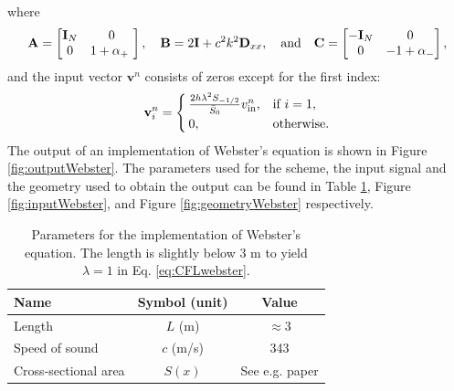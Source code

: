 where 
\begin{equation*}
    \begin{gathered}
    \mathbf{A} = \begin{bmatrix}
        \mathbf{I}_{N}& 0\\
        0 & 1 + \alpha_+\
    \end{bmatrix}, \quad \mathbf{B} = 2\mathbf{I} + c^2 k^2 \mathbf{D}_{xx}, \quad \text{and} \quad \mathbf{C} = \begin{bmatrix}
        -\mathbf{I}_N & 0\\
        0 & -1 + \alpha_-
    \end{bmatrix},
    \end{gathered}
\end{equation*}
and the input vector $\mathbf{v}^n$ consists of zeros except for the first index:
\begin{equation}
    \mathbf{v}_i^n = 
    \begin{cases}
        \frac{2h \lambda^2 S_{-1/2}}{\bar{S}_0}v_\text{in}^n, & \text{if } i = 1,\\
        0,& \text{otherwise}.
    \end{cases}
\end{equation}
%
The output of an implementation of Webster's equation is shown in Figure \ref{fig:outputWebster}. The parameters used for the scheme, the input signal and the geometry used to obtain the output can be found in Table \ref{tab:websterParams}, Figure \ref{fig:inputWebster}, and Figure \ref{fig:geometryWebster} respectively.
\begin{table}[h]
    \begin{center}
    \begin{tabular}{|l|c|c|}
        \hline
        Name & Symbol (unit) & Value\\ \hline
        Length & $L$ (m) & $\approx 3$\\
        Speed of sound & $c$ (m/s) & 343\\
        Cross-sectional area & $S(x)$ & See e.g. paper \citeP[H]\\\hline
        \end{tabular}
    \caption{Parameters for the implementation of Webster's equation. The length is slightly below $3$ m to yield $\lambda = 1$ in Eq. \eqref{eq:CFLwebster}.\label{tab:websterParams}}
    \end{center}
\end{table}
